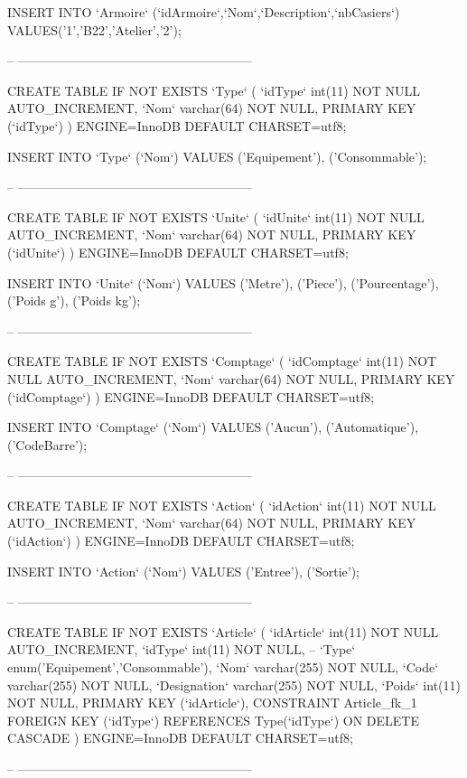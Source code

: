\begin{DoxyCode}
INSERT INTO `Armoire` (`idArmoire`,`Nom`,`Description`,`nbCasiers`) VALUES('1','B22','Atelier','2');

-- --------------------------------------------------------

CREATE TABLE IF NOT EXISTS `Type` (
  `idType` int(11) NOT NULL AUTO\_INCREMENT,
  `Nom` varchar(64) NOT NULL,
  PRIMARY KEY (`idType`)
) ENGINE=InnoDB DEFAULT CHARSET=utf8;

INSERT INTO `Type` (`Nom`) VALUES
('Equipement'),
('Consommable');

-- --------------------------------------------------------

CREATE TABLE IF NOT EXISTS `Unite` (
  `idUnite` int(11) NOT NULL AUTO\_INCREMENT,
  `Nom` varchar(64) NOT NULL,
  PRIMARY KEY (`idUnite`)
) ENGINE=InnoDB DEFAULT CHARSET=utf8;

INSERT INTO `Unite` (`Nom`) VALUES
('Metre'),
('Piece'),
('Pourcentage'),
('Poids g'),
('Poids kg');

-- --------------------------------------------------------

CREATE TABLE IF NOT EXISTS `Comptage` (
  `idComptage` int(11) NOT NULL AUTO\_INCREMENT,
  `Nom` varchar(64) NOT NULL,
  PRIMARY KEY (`idComptage`)
) ENGINE=InnoDB DEFAULT CHARSET=utf8;

INSERT INTO `Comptage` (`Nom`) VALUES
('Aucun'),
('Automatique'),
('CodeBarre');

-- --------------------------------------------------------

CREATE TABLE IF NOT EXISTS `Action` (
  `idAction` int(11) NOT NULL AUTO\_INCREMENT,
  `Nom` varchar(64) NOT NULL,
  PRIMARY KEY (`idAction`)
) ENGINE=InnoDB DEFAULT CHARSET=utf8;

INSERT INTO `Action` (`Nom`) VALUES
('Entree'),
('Sortie');

-- --------------------------------------------------------

CREATE TABLE IF NOT EXISTS `Article` (
  `idArticle` int(11) NOT NULL AUTO\_INCREMENT,
  `idType` int(11) NOT NULL,  
  --   `Type` enum('Equipement','Consommable'),
  `Nom` varchar(255) NOT NULL,
  `Code` varchar(255) NOT NULL,
  `Designation` varchar(255) NOT NULL,
  `Poids` int(11) NOT NULL,  
  PRIMARY KEY (`idArticle`),
  CONSTRAINT Article\_fk\_1 FOREIGN KEY (`idType`) REFERENCES Type(`idType`) ON DELETE CASCADE
) ENGINE=InnoDB DEFAULT CHARSET=utf8;

-- --------------------------------------------------------


\end{DoxyCode}
